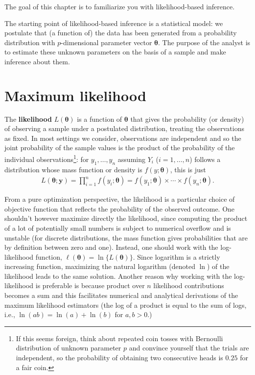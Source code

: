 \documentclass[
  11pt,
  letterpaper,
]{book}
\theoremstyle{definition}
\theoremstyle{definition}
\theoremstyle{definition}
\theoremstyle{remark}
\begin{document}
The goal of this chapter is to familiarize you with likelihood-based inference.

The starting point of likelihood-based inference is a statistical model: we postulate that (a function of) the data has been generated from a probability distribution with \(p\)-dimensional parameter vector \(\boldsymbol{\theta}\). The purpose of the analyst is to estimate these unknown parameters on the basis of a sample and make inference about them.

\hypertarget{maximum-likelihood}{%
\section{Maximum likelihood}\label{maximum-likelihood}}

The \textbf{likelihood} \(L(\boldsymbol{\theta})\) is a function of \(\boldsymbol{\theta}\) that gives the probability (or density) of observing a sample under a postulated distribution, treating the observations as fixed. In most settings we consider, observations are independent and so the joint probability of the sample values is the product of the probability of the individual observations\footnote{If this seems foreign, think about repeated coin tosses with Bernoulli distribution of unknown parameter \(p\) and convince yourself that the trials are independent, so the probability of obtaining two consecutive heads is \(0.25\) for a fair coin.}: for \(y_1, \ldots, y_n\) assuming \(Y_i\) (\(i=1, \ldots, n\)) follows a distribution whose mass function or density is \(f(y; \boldsymbol{\theta})\), this is just
\begin{align*}
L(\boldsymbol{\theta}; \boldsymbol{y}) = \prod_{i=1}^n f(y_i; \boldsymbol{\theta}) = f(y_1; \boldsymbol{\theta}) \times \cdots \times f(y_n; \boldsymbol{\theta}).
\end{align*}

From a pure optimization perspective, the likelihood is a particular choice of objective function that reflects the probability of the observed outcome. One shouldn't however maximize directly the likelihood, since computing the product of a lot of potentially small numbers is subject to numerical overflow and is unstable (for discrete distributions, the mass function gives probabilities that are by definition between zero and one). Instead, one should work with the log-likelihood function, \(\ell(\boldsymbol{\theta}) = \ln\{L(\boldsymbol{\theta})\}\). Since logarithm is a strictly increasing function, maximizing the natural logarithm (denoted \(\ln\)) of the likelihood leads to the same solution. Another reason why working with the log-likelihood is preferable is because product over \(n\) likelihood contributions becomes a sum and this facilitates numerical and analytical derivations of the maximum likelihood estimators (the log of a product is equal to the sum of logs, i.e., \(\ln(ab) =\ln(a) +\ln(b)\) for \(a, b>0\).)
\end{document}
